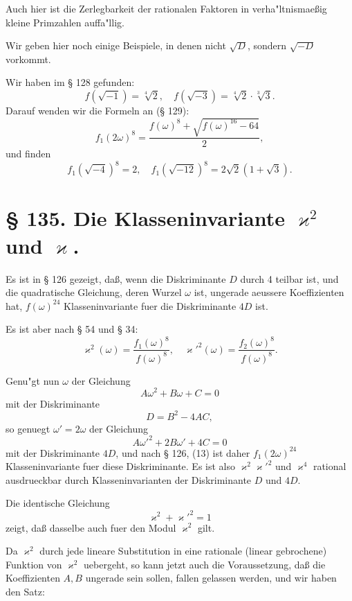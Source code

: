 \documentclass[12pt,a4paper]{article}
\theoremstyle{plain}
\theoremstyle{definition}
\theoremstyle{remark}
\begin{document}
Auch hier ist die Zerlegbarkeit der rationalen Faktoren in verha"ltnismae\ss{}ig kleine Primzahlen auffa"llig.

Wir geben hier noch einige Beispiele, in denen nicht $\sqrt{D}$, sondern $\sqrt{-D}$ vorkommt.

Wir haben im \S{} 128 gefunden:
\[
f(\sqrt{-1}) = \sqrt[4]{2}, \quad f(\sqrt{-3}) = \sqrt[4]{2} \cdot \sqrt[3]{3}.
\]
Darauf wenden wir die Formeln an (\S{} 129):
\[
f_1(2\omega)^8 = \frac{f(\omega)^8 + \sqrt{f(\omega)^{16} - 64}}{2},
\]
und finden
\[
f_1(\sqrt{-4})^8 = 2, \quad f_1(\sqrt{-12})^8 = 2\sqrt{2}(1 + \sqrt{3}).
\]

\newpage

\section*{\S{} 135. Die Klasseninvariante $\varkappa^2$ und $\varkappa$.}

Es ist in \S{} 126 gezeigt, da\ss{}, wenn die Diskriminante $D$ durch 4 teilbar ist, und die quadratische Gleichung, deren Wurzel $\omega$ ist, ungerade aeussere Koeffizienten hat, $f(\omega)^{24}$ Klasseninvariante fuer die Diskriminante $4D$ ist.

Es ist aber nach \S{} 54 und \S{} 34:
\[
\varkappa^2(\omega) = \frac{f_1(\omega)^8}{f(\omega)^8}, \quad \varkappa'^2(\omega) = \frac{f_2(\omega)^8}{f(\omega)^8}.
\]

Genu"gt nun $\omega$ der Gleichung
\begin{equation}\label{eq:135_2}
A\omega^2 + B\omega + C = 0
\end{equation}
mit der Diskriminante
\[
D = B^2 - 4AC,
\]
so genuegt $\omega' = 2\omega$ der Gleichung
\[
A\omega'^2 + 2B\omega' + 4C = 0
\]
mit der Diskriminante $4D$, und nach \S{} 126, (13) ist daher $f_1(2\omega)^{24}$ Klasseninvariante fuer diese Diskriminante. Es ist also $\varkappa^2 \varkappa'^2$ und $\varkappa^4$ rational ausdrueckbar durch Klasseninvarianten der Diskriminante $D$ und $4D$.

Die identische Gleichung
\begin{equation}\label{eq:135_3}
\varkappa^2 + \varkappa'^2 = 1
\end{equation}
zeigt, da\ss{} dasselbe auch fuer den Modul $\varkappa^2$ gilt.

Da $\varkappa^2$ durch jede lineare Substitution in eine rationale (linear gebrochene) Funktion von $\varkappa^2$ uebergeht, so kann jetzt auch die Voraussetzung, da\ss{} die Koeffizienten $A, B$ ungerade sein sollen, fallen gelassen werden, und wir haben den Satz:
\end{document}
